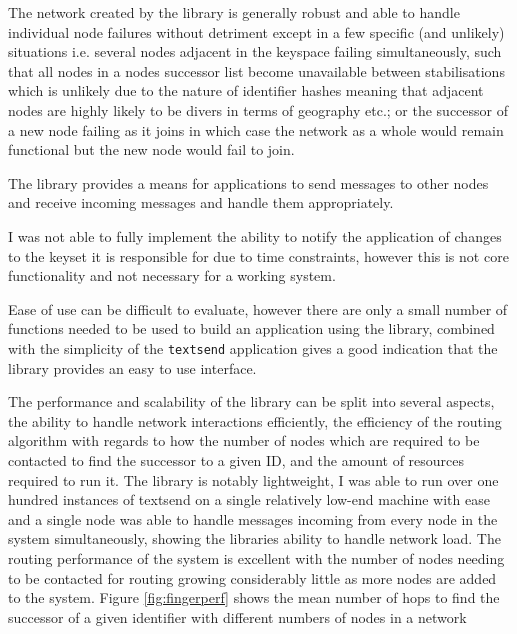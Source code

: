 \documentclass{article}
\begin{document}
The network created by the library is generally robust and able to handle individual node failures without detriment except in a few specific (and unlikely) situations i.e. several nodes adjacent in the keyspace failing simultaneously, such that all nodes in a nodes successor list become unavailable between stabilisations which is unlikely due to the nature of identifier hashes meaning that adjacent nodes are highly likely to be divers in terms of geography etc.; or the successor of a new node failing as it joins in which case the network as a whole would remain functional but the new node would fail to join.

The library provides a means for applications to send messages to other nodes and receive incoming messages and handle them appropriately.

I was not able to fully implement the ability to notify the application of changes to the keyset it is responsible for due to time constraints, however this is not core functionality and not necessary for a working system.


Ease of use can be difficult to evaluate, however there are only a small number of functions needed to be used to build an application using the library, combined with the simplicity of the \texttt{textsend} application gives a good indication that the library provides an easy to use interface.

The performance and scalability of the library can be split into several aspects, the ability to handle network interactions efficiently, the efficiency of the routing algorithm with regards to how the number of nodes which are required to be contacted to find the successor to a given ID, and the amount of resources required to run it.
The library is notably lightweight, I was able to run over one hundred instances of textsend on a single relatively low-end machine with ease and a single node was able to handle messages incoming from every node in the system simultaneously, showing the libraries ability to handle network load.
The routing performance of the system is excellent with the number of nodes needing to be contacted for routing growing considerably little as more nodes are added to the system.
Figure \ref{fig:fingerperf} shows the mean number of hops to find the successor of a given identifier with different numbers of nodes in a network
\end{document}
